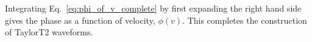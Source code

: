 Integrating Eq.~\ref{eq:phi_of_v_complete} by first expanding the right
hand side gives the phase as a function of velocity, $\phi(v)$. This completes
the construction of TaylorT2 waveforms.
